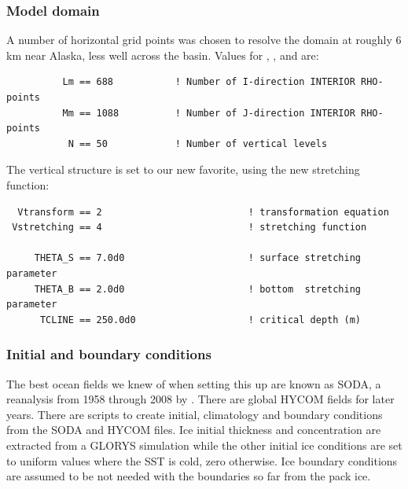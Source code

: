 \subsubsection{Model domain}
A number of horizontal grid points was chosen to resolve the
domain at roughly 6 km near Alaska, less well across the basin. Values
for , , and  are:
\begin{verbatim}
          Lm == 688           ! Number of I-direction INTERIOR RHO-points
          Mm == 1088          ! Number of J-direction INTERIOR RHO-points
           N == 50            ! Number of vertical levels
\end{verbatim}
The vertical structure is set to our new favorite, using the new
stretching function:
\begin{verbatim}
  Vtransform == 2                          ! transformation equation
 Vstretching == 4                          ! stretching function

     THETA_S == 7.0d0                      ! surface stretching parameter
     THETA_B == 2.0d0                      ! bottom  stretching parameter
      TCLINE == 250.0d0                    ! critical depth (m)
\end{verbatim}

\subsubsection{Initial and boundary conditions}
The best ocean fields we knew of when setting this up are known as
SODA, a reanalysis from 1958 through 2008 by \citet{Carton_2005}.
There are global HYCOM fields for later years. There are 
scripts to create initial, climatology and boundary conditions from
the SODA and HYCOM files. Ice initial thickness and concentration
are extracted from a GLORYS simulation while the other initial ice
conditions are set to uniform values where the SST is cold, zero
otherwise. Ice boundary conditions are assumed to be not needed
with the boundaries so far from the pack ice.

